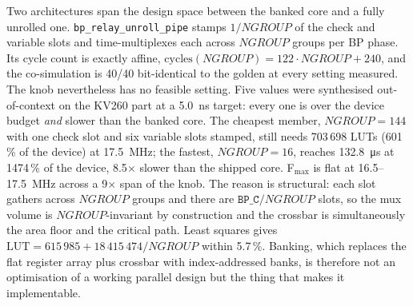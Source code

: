 Two architectures span the design space between the banked core and a fully
unrolled one. \texttt{bp\_relay\_unroll\_pipe} stamps $1/\mathit{NGROUP}$ of
the check and variable slots and time-multiplexes each across $\mathit{NGROUP}$
groups per BP phase. Its cycle count is exactly affine,
$\mathrm{cycles}(\mathit{NGROUP}) = 122\cdot\mathit{NGROUP}+240$, and the
co-simulation is 40/40 bit-identical to the golden at every setting measured.
The knob nevertheless has no feasible setting. Five values were synthesised
out-of-context on the KV260 part at a \SI{5.0}{\nano\second} target: every one
is over the device budget \emph{and} slower than the banked core. The cheapest
member, $\mathit{NGROUP}=144$ with one check slot and six variable slots
stamped, still needs 703\,698 LUTs (601\,\% of the device) at
\SI{17.5}{\mega\hertz}; the fastest, $\mathit{NGROUP}=16$, reaches
\SI{132.8}{\micro\second} at 1474\,\% of the device, 8.5$\times$ slower than
the shipped core. F$_{\max}$ is flat at 16.5--\SI{17.5}{\mega\hertz} across a
9$\times$ span of the knob.
The reason is structural: each slot gathers across $\mathit{NGROUP}$ groups and
there are $\texttt{BP\_C}/\mathit{NGROUP}$ slots, so the mux volume is
$\mathit{NGROUP}$-invariant by construction and the crossbar is simultaneously
the area floor and the critical path. Least squares gives
$\mathrm{LUT} = 615\,985 + 18\,415\,474/\mathit{NGROUP}$ within 5.7\,\%.
Banking, which replaces the flat register array plus crossbar with
index-addressed banks, is therefore not an optimisation of a working parallel
design but the thing that makes it implementable.

